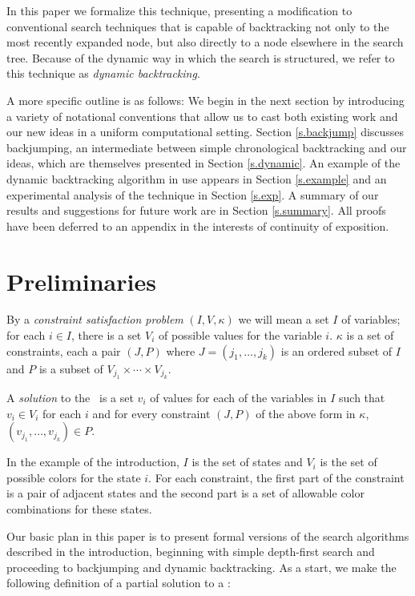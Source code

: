 In this paper we formalize this technique, presenting a modification
to conventional search techniques that is capable of backtracking not
only to the most recently expanded node, but also directly to a node
elsewhere in the search tree.  Because of the dynamic way in which the
search is structured, we refer to this technique as {\em dynamic
backtracking}.

A more specific outline is as follows: We begin in the next section by
introducing a variety of notational conventions that allow us to cast
both existing work and our new ideas in a uniform computational
setting.  Section \ref{s.backjump} discusses backjumping, an
intermediate between simple chronological backtracking and our ideas,
which are themselves presented in Section \ref{s.dynamic}.  An example
of the dynamic backtracking algorithm in use appears in Section
\ref{s.example} and an experimental analysis of the technique in
Section \ref{s.exp}.  A summary of our results and suggestions for
future work are in Section \ref{s.summary}.  All proofs have been
deferred to an appendix in the interests of continuity of exposition.

\section{Preliminaries}

\begin{definition} By a {\em constraint satisfaction problem\/}
$(I,V,\kappa)$ we will mean a set $I$ of variables; for each $i\in I$,
there is a set $V_i$ of possible values for the variable $i$.
$\kappa$ is a set of constraints, each a pair $(J,P)$ where
$J=(j_1,\dots,j_k)$ is an ordered subset of $I$ and $P$ is a subset of
$V_{j_1}\times\cdots\times V_{j_k}$.

A {\em solution\/} to the \csp\ is a set $v_i$ of values for each of
the variables in $I$ such that $v_i\in V_i$ for each $i$ and for every
constraint $(J,P)$ of the above form in $\kappa$,
$(v_{j_1},\dots,v_{j_k})\in P$.
 \end{definition}

In the example of the introduction, $I$ is the set of states and $V_i$
is the set of possible colors for the state $i$.  For each constraint,
the first part of the constraint is a pair of adjacent states and the
second part is a set of allowable color combinations for these states.

Our basic plan in this paper is to present formal versions of the
search algorithms described in the introduction, beginning with simple
depth-first search and proceeding to backjumping and dynamic
backtracking.  As a start, we make the following definition of a
partial solution to a \csp:

